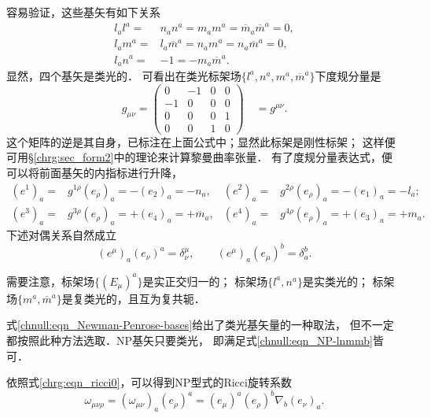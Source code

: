 容易验证，这些基矢有如下关系
\begin{subequations}\label{chnull:eqn_NP-lnmmb}
    \begin{align}
        l_a l^a =& n_a n^a = m_a m^a = \overline{m}_a \overline{m}^a = 0 , \\
        l_a m^a =& l_a \overline{m}^a = n_a m^a = n_a \overline{m}^a = 0 , \\
        l_a n^a =& -1 = - m_a  \overline{m}^a  .\label{chnull:eqn_lm1}
    \end{align}
\end{subequations}
显然，四个基矢是{\kaishu 类光}的．
可看出在类光标架场$\{l^a, n^a, m^a, \overline{m}^a\}$下度规分量是
\begin{equation}\label{chnull:eqn_np-metric}
    g_{\mu \nu } = \left( {\begin{array}{*{20}{c}}
            0&-1&0&0\\
            -1&0&0&0\\
            0&0&0&1\\
            0&0&1&0
    \end{array}} \right)
    \quad = g^{\mu \nu } .
\end{equation}
这个矩阵的逆是其自身，已标注在上面公式中；显然此标架是{\heiti 刚性标架}；
这样便可用\S\ref{chrg:sec_form2}中的理论来计算黎曼曲率张量．
有了度规分量表达式，便可以将前面基矢的内指标进行升降，
\begin{align*}
        (e^1)_a =& g^{1\rho}(e_\rho)_a=-(e_2)_a=-n_a, &
        (e^2)_a =& g^{2\rho}(e_\rho)_a=-(e_1)_a=-l_a;  \\
        (e^3)_a =& g^{3\rho}(e_\rho)_a=+(e_4)_a=+\overline{m}_a, &
        (e^4)_a =& g^{4\rho}(e_\rho)_a=+(e_3)_a=+{m}_a .
\end{align*}
下述对偶关系自然成立
\begin{equation}
    (e^\mu)_a (e_\nu)^a = \delta_\nu^\mu, \qquad
    (e^\mu)_a (e_\mu)^b = \delta_a^b .
\end{equation}

需要注意，标架场$\{(E_\mu)^a\}$是{\kaishu 实}正交归一的；
标架场$\{l^a, n^a\}$是{\kaishu 实}类光的；
标架场$\{m^a, \overline{m}^a\}$是{\kaishu 复}类光的，且互为复共轭．
\begin{remark}
    式\eqref{chnull:eqn_Newman-Penrose-bases}给出了类光基矢量的一种取法，
    但不一定都按照此种方法选取．NP基矢只要类光，
    即满足式\eqref{chnull:eqn_NP-lnmmb}皆可．
\end{remark}

依照式\eqref{chrg:eqn_ricci0}，可以得到NP型式的Ricci旋转系数
\begin{equation}\label{chnull:eqn_NP-spin-coef}
    \omega_{\mu\nu\rho}= (\omega_{\mu\nu})_a(e_\rho)^a
    = (e_\mu)^a (e_\rho)^b \nabla_b (e_\nu)_a .
\end{equation}

